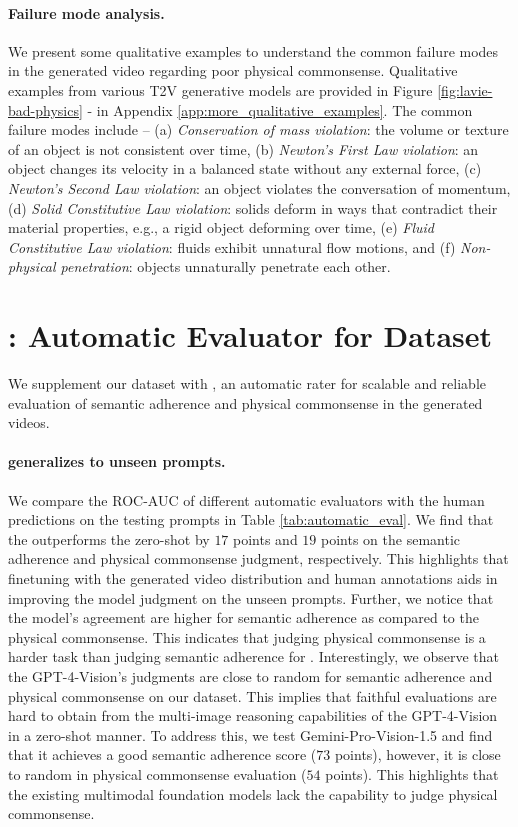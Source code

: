 \paragraph{Failure mode analysis.}
We present some qualitative examples to understand the common failure modes in the generated video regarding poor physical commonsense. Qualitative examples from various T2V generative models are provided in Figure \ref{fig:lavie-bad-physics} - \tx{\ref{fig:luma-bad-physics}} in Appendix \ref{app:more_qualitative_examples}. The common failure modes include -- (a) \textit{Conservation of mass violation}: the volume or texture of an object is not consistent over time, (b) \textit{Newton's First Law violation}: an object changes its velocity in a balanced state without any external force, (c) \textit{Newton's Second Law violation}: an object violates the conversation of momentum, (d) \textit{Solid Constitutive Law violation}: solids deform in ways that contradict their material properties, e.g., a rigid object deforming over time, (e) \textit{Fluid Constitutive Law violation}: fluids exhibit unnatural flow motions, and (f) \textit{Non-physical penetration}: objects unnaturally penetrate each other.
\section{\model{}: Automatic Evaluator for \name{} Dataset}
\label{sec:automatic_evaluation_results}
We supplement our dataset with \model{}, an automatic rater for scalable and reliable evaluation of semantic adherence and physical commonsense in the generated videos. \paragraph{\model{} generalizes to unseen prompts.} We compare the ROC-AUC of different automatic evaluators with the human predictions on the testing prompts in Table \ref{tab:automatic_eval}.  We find that the \model{} outperforms the zero-shot \videocon{} by $17$ points and $19$ points on the semantic adherence and physical commonsense judgment, respectively. This highlights that finetuning with the generated video distribution and human annotations aids in improving the model judgment on the unseen prompts. Further, we notice that the model's agreement are higher for semantic adherence as compared to the physical commonsense. This indicates that judging physical commonsense is a harder task than judging semantic adherence for \model{}. Interestingly, we observe that the GPT-4-Vision's judgments are close to random for semantic adherence and physical commonsense on our dataset. This implies that faithful evaluations are hard to obtain from the multi-image reasoning capabilities of the GPT-4-Vision in a zero-shot manner. To address this, we test Gemini-Pro-Vision-1.5 and find that it achieves a good semantic adherence score ($73$ points), however, it is close to random in physical commonsense evaluation ($54$ points). This highlights that the existing multimodal foundation models lack the capability to judge physical commonsense. 


